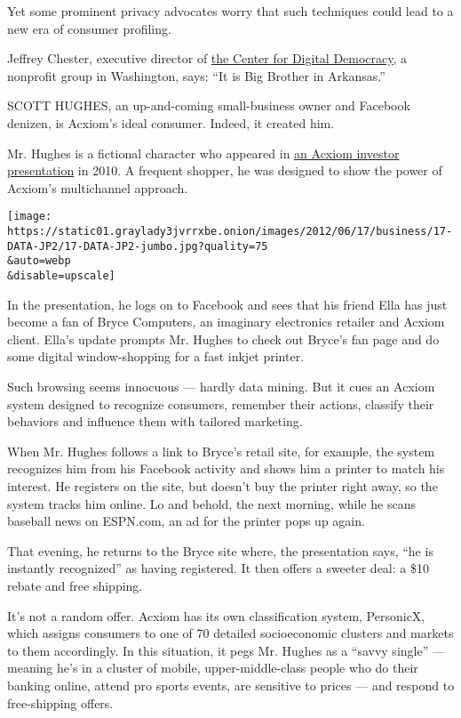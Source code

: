 Yet some prominent privacy advocates worry that such techniques could
lead to a new era of consumer profiling.

Jeffrey Chester, executive director of
\href{http://www.democraticmedia.org/}{the Center for Digital
Democracy}, a nonprofit group in Washington, says: ``It is Big Brother
in Arkansas.''

SCOTT HUGHES, an up-and-coming small-business owner and Facebook
denizen, is Acxiom's ideal consumer. Indeed, it created him.

Mr. Hughes is a fictional character who appeared in
\href{http://www.docstoc.com/docs/65163921/Acxiom-Corporation-Data-Demand-Respect}{an
Acxiom investor presentation} in 2010. A frequent shopper, he was
designed to show the power of Acxiom's multichannel approach.

\texttt{[image: https://static01.graylady3jvrrxbe.onion/images/2012/06/17/business/17-DATA-JP2/17-DATA-JP2-jumbo.jpg?quality=75\\\&auto=webp\\\&disable=upscale]}

In the presentation, he logs on to Facebook and sees that his friend
Ella has just become a fan of Bryce Computers, an imaginary electronics
retailer and Acxiom client. Ella's update prompts Mr. Hughes to check
out Bryce's fan page and do some digital window-shopping for a fast
inkjet printer.

Such browsing seems innocuous --- hardly data mining. But it cues an
Acxiom system designed to recognize consumers, remember their actions,
classify their behaviors and influence them with tailored marketing.

When Mr. Hughes follows a link to Bryce's retail site, for example, the
system recognizes him from his Facebook activity and shows him a printer
to match his interest. He registers on the site, but doesn't buy the
printer right away, so the system tracks him online. Lo and behold, the
next morning, while he scans baseball news on ESPN.com, an ad for the
printer pops up again.

That evening, he returns to the Bryce site where, the presentation says,
``he is instantly recognized'' as having registered. It then offers a
sweeter deal: a \$10 rebate and free shipping.

It's not a random offer. Acxiom has its own classification system,
PersonicX, which assigns consumers to one of 70 detailed socioeconomic
clusters and markets to them accordingly. In this situation, it pegs Mr.
Hughes as a ``savvy single'' --- meaning he's in a cluster of mobile,
upper-middle-class people who do their banking online, attend pro sports
events, are sensitive to prices --- and respond to free-shipping offers.

